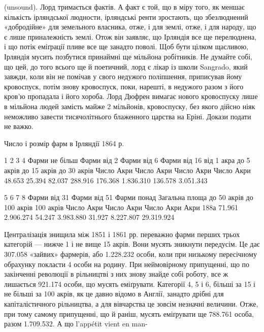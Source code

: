 \parcont{}  %
(unsound). Лорд тримається фактів. А факт є той, що в міру того,
як меншає кількість ірляндської людности, ірляндські ренти
зростають, що збезлюднений «добродійне» для земельного власника,
отже, і для землі, отже, і для народу, що є лише приналежність
землі. Отож він заявляє, що Ірляндія все ще перелюднена,
і що потік еміґрації пливе все ще занадто поволі. Щоб бути цілком
щасливою, Ірляндія мусить позбутися принаймні ще  мільйона
робітників. Не думайте собі, що цей, до того всього ще й
поетичний, лорд є лікар із школи Sangrado, який завжди, коли
він не помічав у свого недужого поліпшення, приписував йому
кровоспуск, потім знову кровоспуск, поки, нарешті, в недужого
разом з його кров’ю пропадала і його хороба. Лорд Дюфрен
вимагає нового кровоспуску лише в  мільйона людей
замість майже 2 мільйонів, кровоспуску, без якого дійсно ніяк
неможливо завести тисячолітнього блаженного царства на Еріні.
Докази подати не важко.

Число і розмір фарм в Ірляндії 1864 р.

             1                                2                           3
               4
Фарми не більш        Фарми  від 2      Фарми від 6                 Фарми від 16
      від 1 акра                 до 5 акрів          до 15 акрів                   до 30 акрів
Число      Акри           Число    Акри      Число     Акри             Число      Акри
 48.653    25.394          82.037  288.916    176.368   1.836.310  136.578   3.051.343

          5                                   6                                7
              8
Фарми від 31              Фарми від 51              Фарми понад           Загальна площа
   до 50 акрів                   до 100 акрів               100 акрів
Число    Акри               Число    Акри              Число   Акри                 Акри 188а
71.961  2.906.274          54.247   3.983.880       31.927 8.227.807              29.319.924

Централізація знищила між 1851 і 1861 рр. переважно фарми
перших трьох категорій — нижче 1 і не вище 15 акрів. Вони
мусять зникнути передусім. Це дає 307.058 «зайвих» фармерів,
або 1.228.232 особи, коли при низькому пересічному обрахунку
покласти 4 особи на родину. При неймовірному припущенні, що
по закінченні революції в рільництві  з них знову знайде собі
роботу, все ж лишається 921.174 особи, що мусять еміґрувати. Категорії
4, 5 і 6, більші за 15 і не більші за 100 акрів, як це давно
відомо в Англії, занадто дрібні для капіталістичного рільництва,
а для вівчарства це зовсім незначні величини. Отже, при
тому самому припущенні, що й раніш, мусять еміґрувати ще
788.761 особа, разом 1.709.532. А що l’appétit vient en man-


